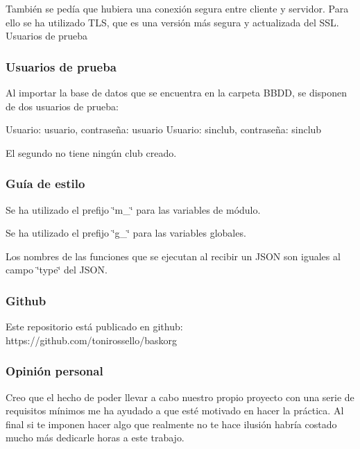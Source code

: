 También se pedía que hubiera una conexión segura entre cliente y servidor. Para ello se ha utilizado T\+LS, que es una versión más segura y actualizada del S\+SL. Usuarios de prueba

\subsubsection*{Usuarios de prueba}

Al importar la base de datos que se encuentra en la carpeta B\+B\+DD, se disponen de dos usuarios de prueba\+:

Usuario\+: usuario, contraseña\+: usuario Usuario\+: sinclub, contraseña\+: sinclub

El segundo no tiene ningún club creado.

\subsubsection*{Guía de estilo}


\begin{DoxyItemize}
\item Se ha utilizado el prefijo \char`\"{}m\+\_\+\char`\"{} para las variables de módulo.
\item Se ha utilizado el prefijo \char`\"{}g\+\_\+\char`\"{} para las variables globales.
\item Los nombres de las funciones que se ejecutan al recibir un J\+S\+ON son iguales al campo \char`\"{}type\char`\"{} del J\+S\+ON.
\end{DoxyItemize}

\subsubsection*{Github}

\begin{DoxyVerb}Este repositorio está publicado en github: https://github.com/tonirossello/baskorg
\end{DoxyVerb}


\subsubsection*{Opinión personal}

Creo que el hecho de poder llevar a cabo nuestro propio proyecto con una serie de requisitos mínimos me ha ayudado a que esté motivado en hacer la práctica. Al final si te imponen hacer algo que realmente no te hace ilusión habría costado mucho más dedicarle horas a este trabajo.

